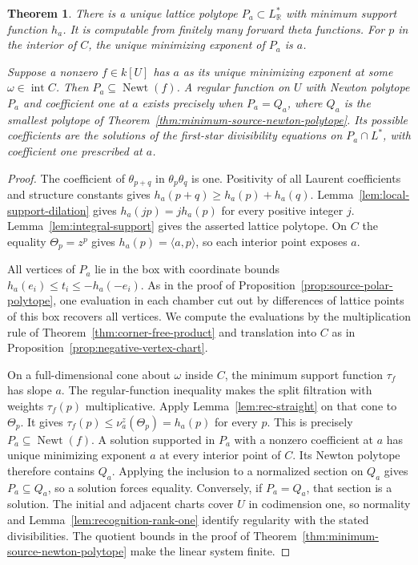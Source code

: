 \documentclass[11pt,reqno]{amsart}
\numberwithin{equation}{section}
\newtheorem{theorem}{Theorem}[section]
\theoremstyle{definition}
\theoremstyle{remark}
\DeclareMathOperator{\Newt}{Newt}
\begin{document}
\begin{theorem}\label{thm:reciprocal-polytope}
There is a unique lattice polytope \(P_a\subset L^*_{\mathbb R}\)
with minimum support function \(h_a\). It is computable from finitely
many forward theta functions. For \(p\) in the interior of \(C\), the
unique minimizing exponent of \(P_a\) is \(a\).

Suppose a nonzero \(f\in k[U]\) has \(a\) as its unique minimizing
exponent at some \(\omega\in\operatorname{int}C\). Then \(P_a\subseteq\Newt(f)\). A regular function on \(U\) with Newton
polytope \(P_a\) and coefficient one at \(a\) exists precisely when
\(P_a=Q_a\), where \(Q_a\) is the smallest polytope of
Theorem~\ref{thm:minimum-source-newton-polytope}. Its possible
coefficients are the solutions of the first-star divisibility
equations on \(P_a\cap L^*\), with coefficient one prescribed at \(a\).
\end{theorem}
\begin{proof}
The coefficient of \(\theta_{p+q}\) in \(\theta_p\theta_q\) is one.
Positivity of all Laurent coefficients and structure constants gives
\(h_a(p+q)\ge h_a(p)+h_a(q)\). Lemma~\ref{lem:local-support-dilation} gives
\(h_a(jp)=j h_a(p)\) for every positive integer \(j\).
Lemma~\ref{lem:integral-support}
gives the asserted lattice polytope. On \(C\) the equality \(\Theta_p=z^p\) gives \(h_a(p)=\langle a,p\rangle\),
so each interior point exposes \(a\).

All vertices of \(P_a\) lie in the box with coordinate bounds
\(h_a(e_i)\le t_i\le-h_a(-e_i)\). As in the proof of
Proposition~\ref{prop:source-polar-polytope}, one evaluation in each
chamber cut out by differences of lattice points of this box recovers
all vertices. We compute the evaluations by the multiplication rule of
Theorem~\ref{thm:corner-free-product} and translation into \(C\) as in
Proposition~\ref{prop:negative-vertex-chart}.

On a full-dimensional cone about \(\omega\) inside \(C\), the minimum
support function \(\tau_f\) has slope \(a\).
The regular-function inequality makes the split filtration with
weights \(\tau_f(p)\) multiplicative. Apply
Lemma~\ref{lem:rec-straight} on that cone to \(\Theta_p\).
It gives \(\tau_f(p)\le\nu^z_a(\Theta_p)=h_a(p)\) for every \(p\).
This is precisely \(P_a\subseteq\Newt (f)\).
A solution supported in \(P_a\) with a nonzero coefficient at \(a\)
has unique minimizing exponent \(a\) at every interior point of \(C\).
Its Newton polytope therefore contains \(Q_a\). Applying the
inclusion to a normalized section on \(Q_a\) gives \(P_a\subseteq Q_a\),
so a solution forces equality. Conversely, if \(P_a=Q_a\), that section
is a solution. The initial and adjacent charts cover \(U\) in
codimension one, so normality and Lemma~\ref{lem:recognition-rank-one}
identify regularity with the stated divisibilities. The quotient bounds in the proof of
Theorem~\ref{thm:minimum-source-newton-polytope} make the linear system finite.
\end{proof}
\end{document}
